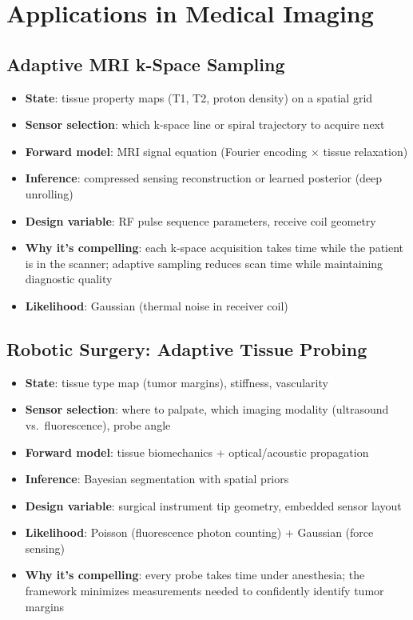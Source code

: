 \documentclass[11pt,a4paper]{article}
\begin{document}
\section{Applications in Medical Imaging}

\subsection{Adaptive MRI k-Space Sampling}

\begin{itemize}[nosep]
  \item \textbf{State}: tissue property maps (T1, T2, proton density) on a spatial grid
  \item \textbf{Sensor selection}: which k-space line or spiral trajectory to acquire next
  \item \textbf{Forward model}: MRI signal equation (Fourier encoding $\times$ tissue relaxation)
  \item \textbf{Inference}: compressed sensing reconstruction or learned posterior (deep unrolling)
  \item \textbf{Design variable}: RF pulse sequence parameters, receive coil geometry
  \item \textbf{Why it's compelling}: each k-space acquisition takes time while the patient is in the scanner; adaptive sampling reduces scan time while maintaining diagnostic quality
  \item \textbf{Likelihood}: Gaussian (thermal noise in receiver coil)
\end{itemize}

\subsection{Robotic Surgery: Adaptive Tissue Probing}

\begin{itemize}[nosep]
  \item \textbf{State}: tissue type map (tumor margins), stiffness, vascularity
  \item \textbf{Sensor selection}: where to palpate, which imaging modality (ultrasound vs.\ fluorescence), probe angle
  \item \textbf{Forward model}: tissue biomechanics + optical/acoustic propagation
  \item \textbf{Inference}: Bayesian segmentation with spatial priors
  \item \textbf{Design variable}: surgical instrument tip geometry, embedded sensor layout
  \item \textbf{Likelihood}: Poisson (fluorescence photon counting) + Gaussian (force sensing)
  \item \textbf{Why it's compelling}: every probe takes time under anesthesia; the framework minimizes measurements needed to confidently identify tumor margins
\end{itemize}
\end{document}
